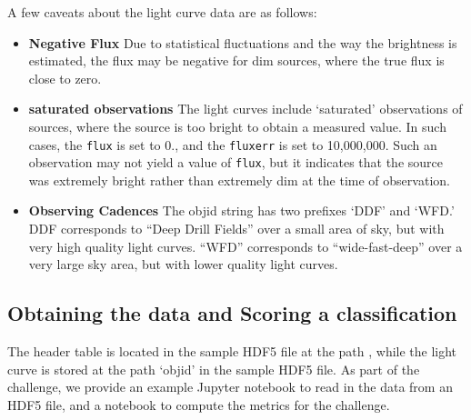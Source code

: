 \documentclass[\docopts]{\docclass}
\begin{document}
A few caveats about the light curve data are as follows:
\begin{itemize}
    \item \textbf{Negative Flux} Due to statistical fluctuations and the way the brightness is estimated, the flux may be negative for dim sources, where the true flux is close to zero. 
    \item \textbf{saturated observations} The light curves include `saturated' observations of sources, where the source is
too bright to obtain a measured value. In such cases, the {\tt flux} is set to 0., and the {\tt fluxerr} is set to 10,000,000. Such an observation may not yield a value of {\tt flux}, but it indicates that the source was extremely bright rather than extremely dim at the time of observation. 
\item \textbf{Observing Cadences} The objid string has two prefixes ‘DDF’ and `WFD.’  DDF corresponds to
“Deep Drill Fields” over a small area of sky, but with very high quality 
light curves. “WFD” corresponds to “wide-fast-deep” over a very large 
sky area, but with lower quality light curves.

\end{itemize}

\clearpage

\subsection{Obtaining the data and Scoring a classification}
The header table is located in the sample HDF5 file at the path {\header}, while the light curve is stored at the path `objid' in the sample HDF5 file. As part of the challenge, we provide an example Jupyter notebook to read in the data from an HDF5 file, and a notebook to compute the metrics for the challenge.
\end{document}
